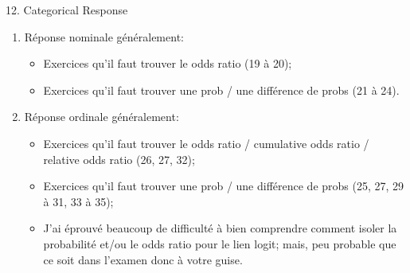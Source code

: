 \documentclass[12pt, titlepage, french]{report}
\begin{document}
\begin{CHPT_SUMM}[label = {GLM-CAT}]{12. Categorical Response}
\begin{enumerate}
	\item	Réponse nominale généralement:
	\begin{itemize}
		\item	Exercices qu'il faut trouver le odds ratio (19 à 20);
		\item	Exercices qu'il faut trouver une prob / une différence de probs (21 à 24).
	\end{itemize}
	\item	Réponse ordinale généralement:
	\begin{itemize}
		\item	Exercices qu'il faut trouver le odds ratio / cumulative odds ratio / relative odds ratio (26, 27, 32);
		\item	Exercices qu'il faut trouver une prob / une différence de probs (25, 27, 29 à 31, 33 à 35);
		\item	J'ai éprouvé beaucoup de difficulté à bien comprendre comment isoler la probabilité et/ou le odds ratio pour le lien logit; mais, peu probable que ce soit dans l'examen donc à votre guise.
	\end{itemize}
\end{enumerate}
\end{CHPT_SUMM}
\end{document}
